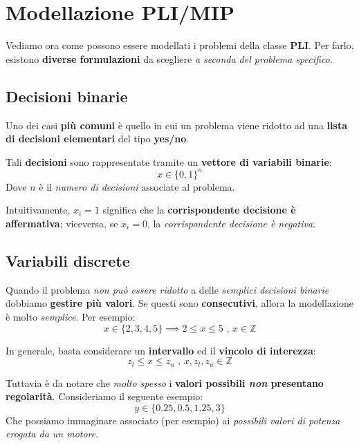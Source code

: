 \section{Modellazione PLI/MIP}

Vediamo ora come possono essere modellati i problemi della classe \textbf{PLI}.
Per farlo, esistono \textbf{diverse formulazioni} da scegliere 
\textit{a seconda del problema specifico}.

\subsection{Decisioni binarie}

Uno dei casi \textbf{più comuni} è quello in cui un problema viene
ridotto ad una \textbf{lista di decisioni elementari} del tipo \textbf{yes/no}.

\begin{definition}
    Tali \textbf{decisioni} sono rappresentate tramite un 
    \textbf{vettore di variabili binarie}:
    \[
        x \in \{0,1\}^n  
    \] 
    Dove $n$ è il \textit{numero di decisioni} associate al problema.
\end{definition}

Intuitivamente, $x_i=1$ significa che la \textbf{corrispondente decisione è affermativa};
viceversa, se $x_i=0$, la \textit{corrispondente decisione è negativa}.

\subsection{Variabili discrete}

Quando il problema \textit{non può essere ridotto}
a delle \textit{semplici decisioni binarie} dobbiamo \textbf{gestire più valori}.
Se questi sono \textbf{consecutivi}, allora la modellazione è molto \textit{semplice}.
Per esempio:
\[
    x \in \{2,3,4,5\} \implies 2\le x \le 5 \text{ , } x \in \mathbb{Z}  
\]

\begin{definition}
    In generale, basta considerare un \textbf{intervallo} ed il \textbf{vincolo di interezza}:
    \[
        z_l \le x \le z_u \text{ , } x, z_l, z_u \in \mathbb{Z} 
    \] 
\end{definition}

Tuttavia è da notare che \textit{molto spesso} i 
\textbf{valori possibili \textit{non} presentano regolarità}.
Consideriamo il seguente esempio:
\[
    y \in \{0.25, 0.5, 1.25, 3\}  
\]
Che possiamo immaginare associato (per esempio) ai 
\textit{possibili valori di potenza erogata da un motore}.

